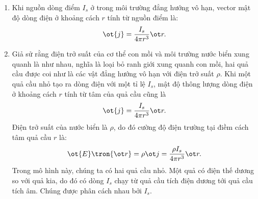 \begin{loigiai}
\begin{enumerate}[1)]
    \item Khi nguồn dòng điểm $I_s$ ở trong môi trường đẳng hướng vô hạn, vector mật độ dòng điện ở khoảng cách $r$ tính từ nguồn điểm là:
    \[\ot{j} = \dfrac{I_{s}}{4 \pi r^{3}} \ot r .\]
    \item Giả sử rằng điện trở suất của cơ thể con mồi và môi trường nước biển xung quanh là như nhau, nghĩa là loại bỏ ranh giới xung quanh con mồi, hai quả cầu được coi như là các vật đẳng hướng vô hạn với điện trở suất $\rho$. Khi một quả cầu nhỏ tạo ra dòng điện với một tỉ lệ $I_{s}$, mật độ thông lượng dòng điện ở khoảng cách $r$ tính từ tâm của quả cầu cũng là
    \[\ot{j} = \dfrac{I_{s}}{4 \pi r^{3}} \ot r .\]
    Điện trở suất của nước biển là $\rho$, do đó cường độ điện trường tại điềm cách tâm quả cầu $r$ là:
    \[\ot{E}\tron{\ot r} = \rho \ot j = \dfrac{\rho I_{s}}{4 \pi r^{3}} \ot r .\]
    Trong mô hình này, chúng ta có hai quả cầu nhỏ. Một quả có điện thế dương so với quả kia, do đó có dòng $I_s$ chạy từ quả cầu tích điện dương tới quả cầu tích âm. Chúng được phân cách nhau bởi $I_s$.
    \begin{center}
        


\begin{tikzpicture}[x=0.75pt,y=0.75pt,yscale=-1,xscale=1]


\end{tikzpicture}
\end{center}
\end{enumerate}
\end{loigiai}
